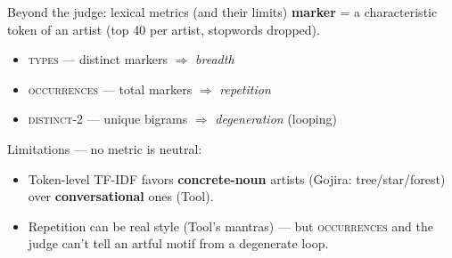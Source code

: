 \documentclass[aspectratio=169]{beamer}
\newcommand{\metric}[1]{\textsc{#1}}   %
\begin{document}

\begin{frame}{Beyond the judge: lexical metrics (and their limits)}
  \footnotesize
  \textbf{marker} = a characteristic token of an artist (top 40 per artist, stopwords dropped).
  \vskip4pt
  \begin{itemize}
    \item \metric{types} --- distinct markers $\Rightarrow$ \emph{breadth}
    \item \metric{occurrences} --- total markers $\Rightarrow$ \emph{repetition}
    \item \metric{distinct-2} --- unique bigrams $\Rightarrow$ \emph{degeneration} (looping)
  \end{itemize}
  \vskip4pt
  {\color{accent}Limitations --- no metric is neutral:}
  \begin{itemize}\footnotesize
    \item Token-level TF-IDF favors \textbf{concrete-noun} artists (Gojira: tree/star/forest) over \textbf{conversational} ones (Tool).
    \item Repetition can be real style (Tool's mantras) --- but \metric{occurrences} and the judge can't tell an artful motif from a degenerate loop.
  \end{itemize}
\end{frame}
\end{document}
